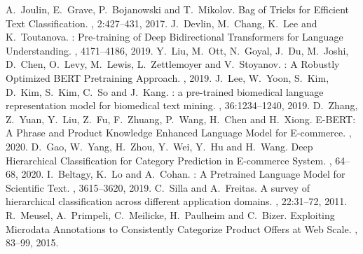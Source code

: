 \documentclass[11pt,dvipdfm]{article}
\begin{document}
\begin{thebibliography}{10}
\itemsep=1pt
\begin{small}

A.~Joulin, E.~Grave, P.~Bojanowski and T.~Mikolov. \newblock Bag of {Tricks} for {Efficient} {Text} {Classification}. , 2:427--431, 2017.
J.~Devlin, M.~Chang, K.~Lee and K.~Toutanova. : {Pre}-training of {Deep} {Bidirectional} {Transformers} for {Language} {Understanding}. , 4171--4186, 2019.
Y.~Liu, M.~Ott, N.~Goyal, J.~Du, M.~Joshi, D.~Chen, O.~Levy, M.~Lewis, L.~Zettlemoyer and V.~Stoyanov. : {A} {Robustly} {Optimized} {BERT} {Pretraining} {Approach}. , 2019.
J.~Lee, W.~Yoon, S.~Kim, D.~Kim, S.~Kim, C.~So and J.~Kang. : a pre-trained biomedical language representation model for biomedical text mining. , 36:1234--1240, 2019.
D.~Zhang, Z.~Yuan, Y.~Liu, Z.~Fu, F.~Zhuang, P.~Wang, H.~Chen and H.~Xiong. \newblock E-{BERT}: {A} {Phrase} and {Product} {Knowledge} {Enhanced} {Language} {Model} for {E}-commerce. , 2020.
D.~Gao, W.~Yang, H.~Zhou, Y.~Wei, Y.~Hu and H.~Wang. \newblock Deep {Hierarchical} {Classification} for {Category} {Prediction} in {E}-commerce {System}. , 64--68, 2020.
I.~Beltagy, K.~Lo and A.~Cohan. : {A} {Pretrained} {Language} {Model} for {Scientific} {Text}. , 3615--3620, 2019.
C.~Silla and A.~Freitas. \newblock A survey of hierarchical classification across different application domains. , 22:31--72, 2011.
R.~Meusel, A.~Primpeli, C.~Meilicke, H.~Paulheim and C.~Bizer. \newblock Exploiting {Microdata} {Annotations} to {Consistently} {Categorize} {Product} {Offers} at {Web} {Scale}. , 83--99, 2015.

\end{small}
\end{thebibliography}
\end{document}

